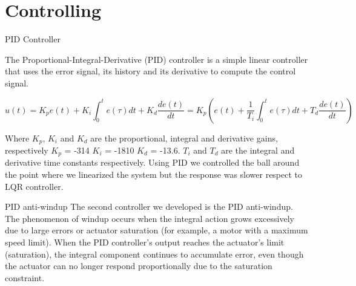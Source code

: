 \section{Controlling}

\begin{frame}{PID Controller}

\label{subsec:pid}

The Proportional-Integral-Derivative (PID) controller is a simple linear controller that uses the error signal, its history and its derivative to compute the control signal.

\begin{equation}
    u(t) = K_p e(t) + K_i \int_{0}^{t} e(\tau)dt + K_d \frac{de(t)}{dt} = K_p \left(e(t) + \frac{1}{T_i} \int_{0}^{t} e(\tau)dt + T_d \frac{de(t)}{dt}\right)
\end{equation}

Where $K_p$, $K_i$ and $K_d$ are the proportional, integral and derivative gains, respectively $K_p$ = -314 $K_i$ = -1810 $K_d$ = -13.6. $T_i$ and $T_d$ are the integral and derivative time constants respectively. Using PID we controlled the ball around the point where we linearized the system but the response was slower respect to LQR controller.

\end{frame}

\begin{frame}{PID anti-windup}
The second controller we developed is the PID anti-windup.
The phenomenon of windup occurs when the integral action grows excessively due to large errors or actuator saturation (for example, a motor with a maximum speed limit). When the PID controller's output reaches the actuator's limit (saturation), the integral component continues to accumulate error, even though the actuator can no longer respond proportionally due to the saturation constraint.
\begin{table}[h!]
\centering
{}
\caption{Comparison of Classic PID and PID Anti-Windup}
\end{table}
\end{frame}


